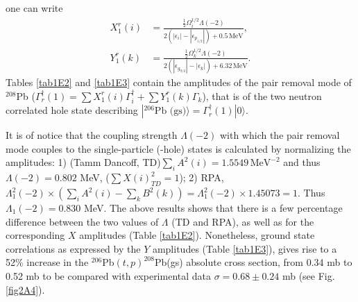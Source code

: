 one can write
\begin{equation*}
\begin{split}
X_1^r(i)&=\frac{\frac{1}{2}\Omega_i^{1/2}\Lambda(-2)}{2(|\epsilon_i|-|\epsilon_{p_{1/2}}|)+0.5\,\text{MeV}},\\ Y_1^r(k)&=\frac{\frac{1}{2}\Omega_k^{1/2}\Lambda(-2)}{2(|\epsilon_{g_{9/2}}|-|\epsilon_k|)+6.32\,\text{MeV}}.
\end{split}
\end{equation*}
Tables \ref{tab1E2} and \ref{tab1E3} contain the amplitudes of the pair removal mode of $^{208}$Pb ($\Gamma^\dagger_r(1)=\sum X^r_{1}(i)\Gamma^\dagger_i+\sum Y^r_{1}(k)\Gamma_k$), that is of the two neutron  correlated hole state describing $|^{206}\text{Pb (gs)}\rangle=\Gamma^\dagger_r(1)|0\rangle$. 


It is of notice that the coupling strength $\Lambda (-2)$ with which the pair removal mode couples to the single-particle (-hole) states is calculated by normalizing the amplitudes: 1) (Tamm Dancoff, TD)$\sum_iA^2(i)=1.5549 \,\text{MeV}^{-2}$ and thus $\Lambda (-2)=0.802$ MeV, ($\sum X(i)^2_{TD}=1$); 2) RPA, $\Lambda_1^2 (-2)\times(\sum_i A^2(i)-\sum_k B^2(k))=\Lambda_1^2(-2)\times1.45073=1$. Thus $\Lambda_1(-2)=0.830$ MeV. The above results shows that there is a few percentage difference between the two values of $\Lambda$ (TD and RPA), as well as for the corresponding $X$ amplitudes (Table \ref{tab1E2}). Nonetheless, ground state correlations as expressed by the $Y$ amplitudes (Table \ref{tab1E3}), gives rise to a 52\% increase in the $^{206}$Pb$(t,p)^{208}$Pb(gs) absolute cross section, from 0.34 mb to 0.52 mb to be compared with experimental data $\sigma=0.68\pm 0.24$ mb (see Fig. \ref{fig2A4}).



